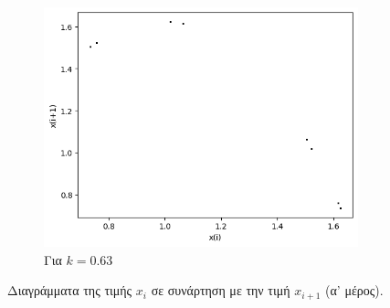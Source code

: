 \begin{figure}[ht]
\begin{subfigure}[b]{0.4\textwidth}
		\includegraphics[width=\textwidth]{LateX images/graphs q09/g13}
		\caption{Για $k=0.63$}
		\label{f:k52}
	\end{subfigure}
	\hfill
	\caption{Διαγράμματα της τιμής \(x_i\) σε συνάρτηση με την τιμή \(x_{i+1}\) (α' μέρος).}
\end{figure}
